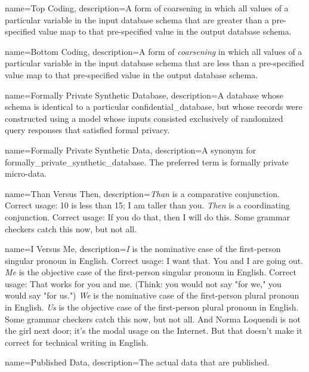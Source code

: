 {
    name=Top Coding,
    description={A form of \gls{coarsening} in which all values of a particular variable in the input database schema that are greater than a pre-specified value map to that pre-specified value in the output database schema.}
}

{
    name=Bottom Coding,
    description={A form of \emph{coarsening} in which all values of a particular variable in the input database schema that are less than a pre-specified value map to that pre-specified value in the output database schema.}
}

{
    name=Formally Private Synthetic Database,
    description={A \gls{database} whose schema is identical to a particular \gls{confidential_database}, but whose \glspl{record} were constructed using a model whose inputs consisted exclusively of randomized query responses that satisfied formal privacy.}
}

{
    name=Formally Private Synthetic Data,
    description={A synonym for \gls{formally_private_synthetic_database}. The preferred term is formally private micro-data.}
}

{
    name=Than Versus Then,
    description={\textit{Than} is a comparative conjunction. Correct usage: 10 is less than 15; I am taller than you. \textit{Then} is a coordinating conjunction. Correct usage: If you do that, then I will do this. Some grammar checkers catch this now, but not all.}
}

{
    name=I Versus Me,
    description={\textit{I} is the nominative case of the first-person singular pronoun in English. Correct usage: I want that. You and I are going out. \textit{Me} is the objective case of the first-person singular pronoun in English. Correct usage: That works for you and me. (Think: you would not say "for we," you would say "for us.") \textit{We} is the nominative case of the first-person plural pronoun in English. \textit{Us} is the objective case of the first-person plural pronoun in English. Some grammar checkers catch this now, but not all. And Norma Loquendi is not the girl next door; it's the modal usage on the Internet. But that doesn't make it correct for technical writing in English.}
}

{
    name=Published Data,
    description={The actual data that are published.}
}


